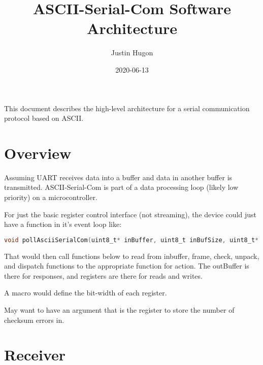 \documentclass{customdocclass}
\title{ASCII-Serial-Com Software Architecture}
\author{Justin Hugon}
\date{2020-06-13}
\begin{document}
\maketitle

This document describes the high-level architecture for a serial communication
protocol based on ASCII.

\section{Overview}

Assuming UART receives data into a buffer and data in another buffer is
transmitted. ASCII-Serial-Com is part of a data processing loop (likely low
priority) on a microcontroller.

For just the basic register control interface (not streaming), the device could
just have a function in it's event loop like:

\begin{lstlisting}[language=C]
void pollAsciiSerialCom(uint8_t* inBuffer, uint8_t inBufSize, uint8_t* outBuffer, uint8_t outBufSize, void* registers, uint16_t regSize);
\end{lstlisting}

That would then call functions below to read from inbuffer, frame, check,
unpack, and dispatch functions to the appropriate function for action. The
outBuffer is there for responses, and registers are there for reads and writes.

A macro would define the bit-width of each register.

May want to have an argument that is the register to store the number of
checksum errors in.

\section{Receiver}
\end{document}
